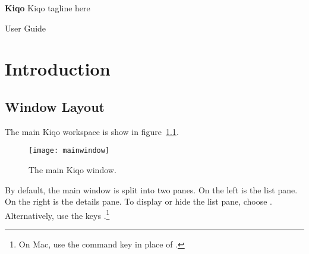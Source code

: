 \documentclass[11pt,fleqn]{book} %
\begin{document}

\begingroup
\thispagestyle{empty}
\centering
\vspace*{5cm}
\par\normalfont\fontsize{35}{35}\sffamily\selectfont
\textbf{Kiqo}
{\LARGE Kiqo tagline here}\par %
\vspace*{1cm}
{\Huge User Guide}\par %
\endgroup


\tableofcontents %


\chapter{Introduction}

\section{Window Layout}
The main Kiqo workspace is show in figure~\ref{fig:mainwindow}.

\begin{figure}[h]
  \centering
  \texttt{[image: mainwindow]}
  \caption{The main Kiqo window.\label{fig:mainwindow}}
\end{figure}

\pagebreak
By default, the main window is split into two panes.
On the left is the list pane.
On the right is the details pane.
To display or hide the list pane, choose .
Alternatively, use the keys .\footnote{On Mac,
use the command key \keys{\cmd} in place of \keys{\ctrl}.}\\
\end{document}
